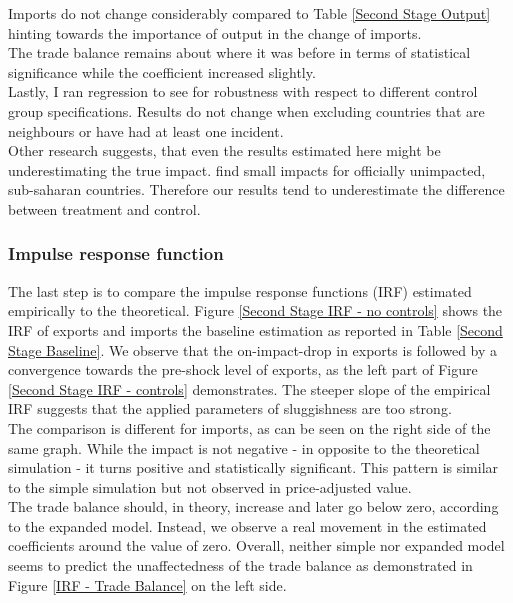 \documentclass{article}
\begin{document}
Imports do not change considerably compared to Table \ref{Second Stage Output} hinting towards the importance of output in the change of imports. \\
The trade balance remains about where it was before in terms of statistical significance while the coefficient increased slightly.\\
Lastly, I ran regression to see for robustness with respect to different control group specifications. Results do not change when excluding countries that are neighbours or have had at least one incident. \\
Other research suggests, that even the results estimated here might be underestimating the true impact. \cite{thomas2015economic} find small impacts for officially unimpacted, sub-saharan countries. Therefore our results tend to underestimate the difference between treatment and control.

\subsubsection{Impulse response function}

The last step is to compare the impulse response functions (IRF) estimated empirically to the theoretical. Figure \ref{Second Stage IRF - no controls} shows the IRF of exports and imports the baseline estimation as reported in Table \ref{Second Stage Baseline}. We observe that the on-impact-drop in exports is followed by a convergence towards the pre-shock level of exports, as the left part of Figure \ref{Second Stage IRF - controls} demonstrates. The steeper slope of the empirical IRF suggests that the applied parameters of sluggishness are too strong. \\
The comparison is different for imports, as can be seen on the right side of the same graph. While the impact is not negative - in opposite to the theoretical simulation - it turns positive and statistically significant. This pattern is similar to the simple simulation but not observed in price-adjusted value. \\
The trade balance should, in theory, increase and later go below zero, according to the expanded model. Instead, we observe a real movement in the estimated coefficients around the value of zero. Overall, neither simple nor expanded model seems to predict the unaffectedness of the trade balance as demonstrated in Figure \ref{IRF - Trade Balance} on the left side.
\end{document}
